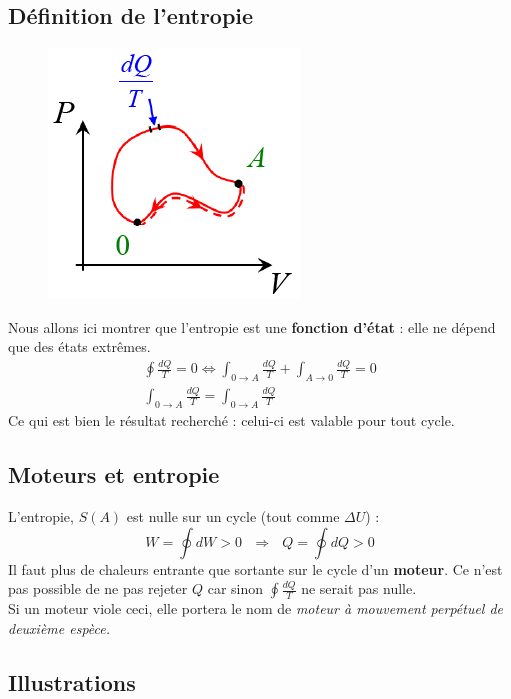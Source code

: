 \documentclass	[11pt, a4paper, openany]{book}
\begin{document}
\subsection{Définition de l'entropie}
\begin{figure}
	\includegraphics[scale=0.44]{th/image19.png}
\end{figure}
Nous allons ici montrer que l'entropie est une \textbf{fonction d'état} : elle ne dépend que des états extrêmes.
\begin{eqnarray}
	\oint \frac{dQ}{T} = 0 \Leftrightarrow \int_{0 \rightarrow A} \frac{dQ}{T} + \int_{A \rightarrow 0} \frac{dQ}{T} = 0\\
	\int_{0 \rightarrow A} \frac{dQ}{T} = \int_{0 \rightarrow A} \frac{dQ}{T}
\end{eqnarray}
Ce qui est bien le résultat recherché : celui-ci est valable pour tout cycle.


\subsection{Moteurs et entropie}
L'entropie, $S(A)$ est nulle sur un cycle (tout comme $\Delta U$) :
\begin{equation}
	W = \oint dW > 0\ \ \ \Rightarrow\ \ \ Q = \oint dQ > 0
\end{equation}
Il faut plus de chaleurs entrante que sortante sur le cycle d'un \textbf{moteur}. Ce n'est pas possible de ne pas rejeter $Q$ car sinon $\oint \frac{dQ}{T}$ ne serait pas nulle.\\
Si un moteur viole ceci, elle portera le nom de \textit{moteur à mouvement perpétuel de deuxième espèce.}

\subsection{Illustrations}
\end{document}

